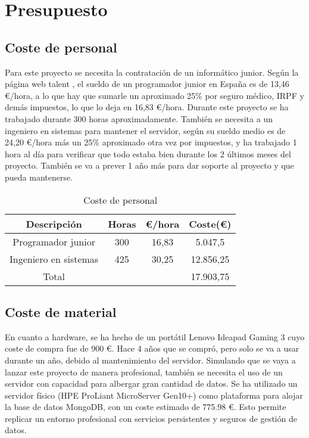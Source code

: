 \section{Presupuesto}
\subsection*{Coste de personal}
Para este proyecto se necesita la contratación de un informático junior. Según la página web talent \cite{sueldo-junior}, el sueldo de un programador junior en España es de 13,46 €/hora, a lo que hay que sumarle un aproximado 25\% por seguro médico, IRPF y demás impuestos, lo que lo deja en 16,83 €/hora. Durante este proyecto se ha trabajado durante 300 horas aproximadamente. También se necesita a un ingeniero en sistemas para mantener el servidor, según \cite{sueldo-sistemas} su sueldo medio es de 24,20 €/hora más un 25\% aproximado otra vez por impuestos, y ha trabajado 1 hora al día para verificar que todo estaba bien durante los 2 últimos meses del proyecto. También se va a prever 1 año más para dar soporte al proyecto y que pueda mantenerse.

\begin{table}[h!]
\centering
\begin{tabular}{|c|c|c|c|}
\hline
\textbf{Descripción} & \textbf{Horas} & \textbf{€/hora} & \textbf{Coste(€)} \\
\hline
Programador junior & 300 & 16,83 & 5.047,5 \\
\hline
Ingeniero en sistemas & 425 & 30,25 & 12.856,25 \\
\hline
Total &  &  & 17.903,75 \\
\hline
\end{tabular}
\caption{Coste de personal}
\label{tab:ejemplo}
\end{table}

\subsection*{Coste de material}
En cuanto a hardware, se ha hecho de un portátil Lenovo Ideapad Gaming 3 cuyo coste de compra fue de 900 €. Hace 4 años que se compró, pero solo se va a usar durante un año, debido al mantenimiento del servidor. Simulando que se vaya a lanzar este proyecto de manera profesional, también se necesita el uso de un servidor con capacidad para albergar gran cantidad de datos. Se ha utilizado un servidor físico (HPE ProLiant MicroServer Gen10+) como plataforma para alojar la base de datos MongoDB, con un coste estimado de 775.98 €. Esto permite replicar un entorno profesional con servicios persistentes y seguros de gestión de datos.

